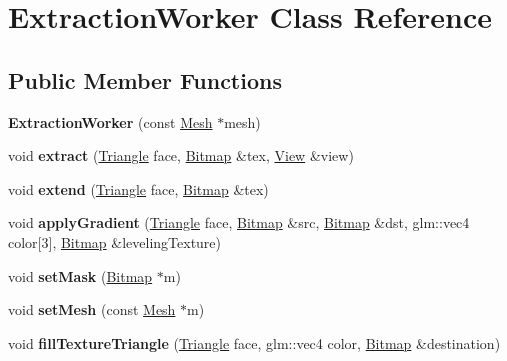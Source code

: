 \hypertarget{class_extraction_worker}{}\section{Extraction\+Worker Class Reference}
\label{class_extraction_worker}
\subsection*{Public Member Functions}
\begin{DoxyCompactItemize}
\item 
\hypertarget{class_extraction_worker_a5cb5231da6a9c3568c1cbdeaa90a30e2}{}{\bfseries Extraction\+Worker} (const \hyperlink{class_mesh}{Mesh} $\ast$mesh)\label{class_extraction_worker_a5cb5231da6a9c3568c1cbdeaa90a30e2}

\item 
\hypertarget{class_extraction_worker_ad649a3ebbc506e55d5b003381b07ba06}{}void {\bfseries extract} (\hyperlink{struct_triangle}{Triangle} face, \hyperlink{class_bitmap}{Bitmap} \&tex, \hyperlink{class_view}{View} \&view)\label{class_extraction_worker_ad649a3ebbc506e55d5b003381b07ba06}

\item 
\hypertarget{class_extraction_worker_a24312158a7768088b96dd722414786ae}{}void {\bfseries extend} (\hyperlink{struct_triangle}{Triangle} face, \hyperlink{class_bitmap}{Bitmap} \&tex)\label{class_extraction_worker_a24312158a7768088b96dd722414786ae}

\item 
\hypertarget{class_extraction_worker_ac956797cff498d82f040d3884be2144d}{}void {\bfseries apply\+Gradient} (\hyperlink{struct_triangle}{Triangle} face, \hyperlink{class_bitmap}{Bitmap} \&src, \hyperlink{class_bitmap}{Bitmap} \&dst, glm\+::vec4 color\mbox{[}3\mbox{]}, \hyperlink{class_bitmap}{Bitmap} \&leveling\+Texture)\label{class_extraction_worker_ac956797cff498d82f040d3884be2144d}

\item 
\hypertarget{class_extraction_worker_a3ae8fdacd8e2a0b44873c36b6e3756e5}{}void {\bfseries set\+Mask} (\hyperlink{class_bitmap}{Bitmap} $\ast$m)\label{class_extraction_worker_a3ae8fdacd8e2a0b44873c36b6e3756e5}

\item 
\hypertarget{class_extraction_worker_a0bfb06fd0caed6ec032416e8d928fbe8}{}void {\bfseries set\+Mesh} (const \hyperlink{class_mesh}{Mesh} $\ast$m)\label{class_extraction_worker_a0bfb06fd0caed6ec032416e8d928fbe8}

\item 
\hypertarget{class_extraction_worker_a25d7438c2adfc4e4e4076954516a4f43}{}void {\bfseries fill\+Texture\+Triangle} (\hyperlink{struct_triangle}{Triangle} face, glm\+::vec4 color, \hyperlink{class_bitmap}{Bitmap} \&destination)\label{class_extraction_worker_a25d7438c2adfc4e4e4076954516a4f43}

\end{DoxyCompactItemize}


